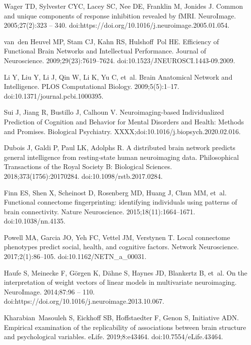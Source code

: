 \documentclass[10pt,letterpaper]{article}
\begin{document}
\begin{thebibliography}{10}
Wager TD, Sylvester CYC, Lacey SC, Nee DE, Franklin M, Jonides J.
\newblock Common and unique components of response inhibition revealed by fMRI.
\newblock NeuroImage. 2005;27(2):323 -- 340.
\newblock doi:{https://doi.org/10.1016/j.neuroimage.2005.01.054}.

van~den Heuvel MP, Stam CJ, Kahn RS, Hulshoff~Pol HE.
\newblock Efficiency of Functional Brain Networks and Intellectual Performance.
\newblock Journal of Neuroscience. 2009;29(23):7619--7624.
\newblock doi:{10.1523/JNEUROSCI.1443-09.2009}.

Li Y, Liu Y, Li J, Qin W, Li K, Yu C, et~al.
\newblock Brain Anatomical Network and Intelligence.
\newblock PLOS Computational Biology. 2009;5(5):1--17.
\newblock doi:{10.1371/journal.pcbi.1000395}.

Sui J, Jiang R, Bustillo J, Calhoun V.
\newblock Neuroimaging-based Individualized Prediction of Cognition and
  Behavior for Mental Disorders and Health: Methods and Promises.
\newblock Biological Psychiatry. XXXX;doi:{10.1016/j.biopsych.2020.02.016}.

Dubois J, Galdi P, Paul LK, Adolphs R.
\newblock A distributed brain network predicts general intelligence from
  resting-state human neuroimaging data.
\newblock Philosophical Transactions of the Royal Society B: Biological
  Sciences. 2018;373(1756):20170284.
\newblock doi:{10.1098/rstb.2017.0284}.

Finn ES, Shen X, Scheinost D, Rosenberg MD, Huang J, Chun MM, et~al.
\newblock Functional connectome fingerprinting: identifying individuals using
  patterns of brain connectivity.
\newblock Nature Neuroscience. 2015;18(11):1664--1671.
\newblock doi:{10.1038/nn.4135}.

Powell MA, Garcia JO, Yeh FC, Vettel JM, Verstynen T.
\newblock Local connectome phenotypes predict social, health, and cognitive
  factors.
\newblock Network Neuroscience. 2017;2(1):86--105.
\newblock doi:{10.1162/NETN\_a\_00031}.

Haufe S, Meinecke F, Görgen K, Dähne S, Haynes JD, Blankertz B, et~al.
\newblock On the interpretation of weight vectors of linear models in
  multivariate neuroimaging.
\newblock NeuroImage. 2014;87:96 -- 110.
\newblock doi:{https://doi.org/10.1016/j.neuroimage.2013.10.067}.

Kharabian~Masouleh S, Eickhoff SB, Hoffstaedter F, Genon S, Initiative ADN.
\newblock Empirical examination of the replicability of associations between
  brain structure and psychological variables.
\newblock eLife. 2019;8:e43464.
\newblock doi:{10.7554/eLife.43464}.


\end{thebibliography}
\end{document}
